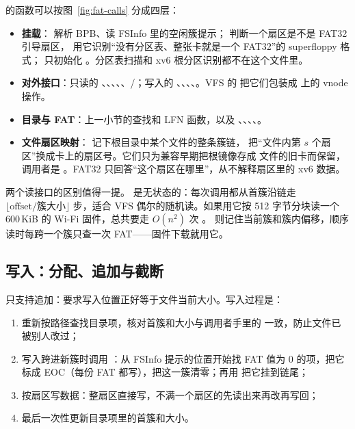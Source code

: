  的函数可以按图~\ref{fig:fat-calls} 分成四层：

\begin{itemize}
  \item \textbf{挂载}： 解析 BPB、读 FSInfo 里的空闲簇提示； 判断一个扇区是不是 FAT32 引导扇区， 用它识别“没有分区表、整张卡就是一个 FAT32”的 superfloppy 格式； 只初始化 。分区表扫描和 xv6 根分区识别都不在这个文件里。
  \item \textbf{对外接口}：只读的 、、、、、/；写入的 、、、、。VFS 的  把它们包装成  上的 vnode 操作。
  \item \textbf{目录与 FAT}：上一小节的查找和 LFN 函数，以及 、、、、。
  \item \textbf{文件扇区映射}： 记下根目录中某个文件的整条簇链， 把“文件内第 $s$ 个扇区”换成卡上的扇区号。它们只为兼容早期把根镜像存成  文件的旧卡而保留，调用者是 。FAT32 只回答“这个扇区在哪里”，从不解释扇区里的 xv6 数据。
\end{itemize}

两个读接口的区别值得一提。 是无状态的：每次调用都从首簇沿链走 $\lfloor\text{offset}/\text{簇大小}\rfloor$ 步，适合 VFS 偶尔的随机读。如果用它按 512 字节分块读一个 600\,KiB 的 Wi-Fi 固件，总共要走 $O(n^2)$ 次 。 则记住当前簇和簇内偏移，顺序读时每跨一个簇只查一次 FAT——固件下载就用它。

\subsection{写入：分配、追加与截断}

 只支持追加：要求写入位置正好等于文件当前大小。写入过程是：

\begin{enumerate}
  \item 重新按路径查找目录项，核对首簇和大小与调用者手里的  一致，防止文件已被别人改过；
  \item 写入跨进新簇时调用 ：从 FSInfo 提示的位置开始找 FAT 值为 0 的项，把它标成 EOC（每份 FAT 都写），把这一簇清零；再用  把它挂到链尾；
  \item 按扇区写数据：整扇区直接写，不满一个扇区的先读出来再改再写回；
  \item 最后一次性更新目录项里的首簇和大小。
\end{enumerate}

